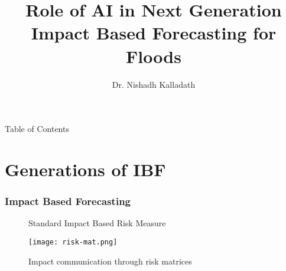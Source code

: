 \documentclass{beamer}
\title{Role of AI in Next Generation\\ Impact Based Forecasting for Floods}
\author{Dr. Nishadh Kalladath}
\institute{DRM Program\\ IGAD Climate Prediction and Applications Centre - ICPAC}
\begin{document}
\begin{frame}
    \maketitle
\end{frame}

%
%
%
%
%
%
%
%
%
%
%
\begin{frame}{Table of Contents}
	\tableofcontents
\end{frame}

\section{Generations of IBF}	

\begin{frame}
	\frametitle{Impact Based Forecasting}
	\begin{figure}[h]
		\centering
\caption{Standard Impact Based Risk Measure}
\label{fig:my_tikz}
\end{figure}


\begin{figure}
	\texttt{[image: risk-mat.png]} 
	\caption{Impact communication through risk matrices}
\end{figure}
\end{frame}
\end{document}
